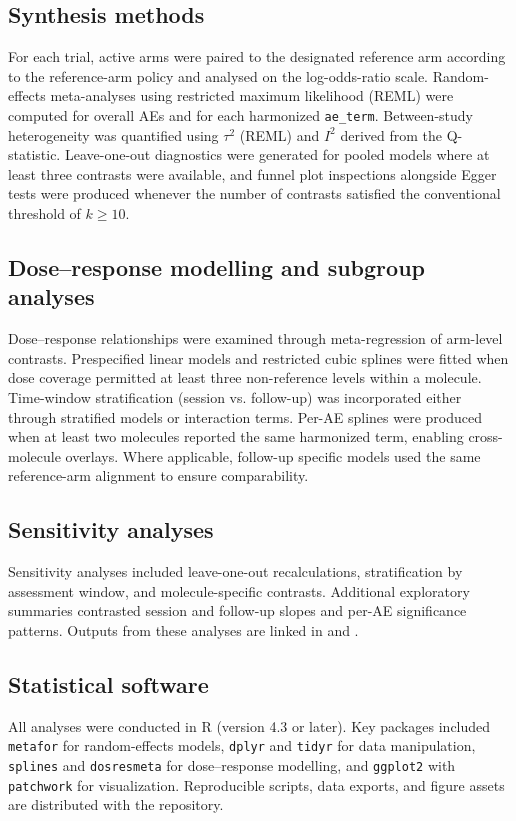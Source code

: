 \subsection{Synthesis methods}
For each trial, active arms were paired to the designated reference arm according to the reference-arm policy and analysed on the log-odds-ratio scale. Random-effects meta-analyses using restricted maximum likelihood (REML) were computed for overall AEs and for each harmonized \texttt{ae\_term}. Between-study heterogeneity was quantified using $\tau^2$ (REML) and $I^2$ derived from the Q-statistic. Leave-one-out diagnostics were generated for pooled models where at least three contrasts were available, and funnel plot inspections alongside Egger tests were produced whenever the number of contrasts satisfied the conventional threshold of $k\geq10$.

\subsection{Dose--response modelling and subgroup analyses}
Dose--response relationships were examined through meta-regression of arm-level contrasts. Prespecified linear models and restricted cubic splines were fitted when dose coverage permitted at least three non-reference levels within a molecule. Time-window stratification (session vs. follow-up) was incorporated either through stratified models or interaction terms. Per-AE splines were produced when at least two molecules reported the same harmonized term, enabling cross-molecule overlays. Where applicable, follow-up specific models used the same reference-arm alignment to ensure comparability.

\subsection{Sensitivity analyses}
Sensitivity analyses included leave-one-out recalculations, stratification by assessment window, and molecule-specific contrasts. Additional exploratory summaries contrasted session and follow-up slopes and per-AE significance patterns. Outputs from these analyses are linked in  and .

\subsection{Statistical software}
All analyses were conducted in R (version 4.3 or later). Key packages included \texttt{metafor} for random-effects models, \texttt{dplyr} and \texttt{tidyr} for data manipulation, \texttt{splines} and \texttt{dosresmeta} for dose--response modelling, and \texttt{ggplot2} with \texttt{patchwork} for visualization. Reproducible scripts, data exports, and figure assets are distributed with the repository.

